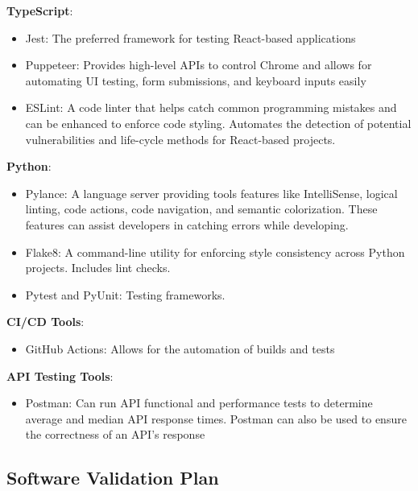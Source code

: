 \documentclass[12pt, titlepage]{article}
\begin{document}
  \textbf{TypeScript}:
   \begin{itemize}
   \item Jest: The preferred framework for testing React-based applications
   \item Puppeteer: Provides high-level APIs to control Chrome and allows for automating UI testing, form submissions, and keyboard inputs easily
   \item ESLint: A code linter that helps catch common programming mistakes and can be enhanced to enforce code styling. Automates the detection of potential vulnerabilities and life-cycle methods for React-based projects.
   \end{itemize}
   \textbf{Python}:
   \begin{itemize}
   \item Pylance: A language server providing tools features like IntelliSense, logical linting, code actions, code navigation, and semantic colorization. These features can assist developers in catching errors while developing.
   \item Flake8: A command-line utility for enforcing style consistency across Python projects. Includes lint checks.
   \item Pytest and PyUnit: Testing frameworks.
   \end{itemize}
  \textbf{CI/CD Tools}:
  \begin{itemize}
  \item GitHub Actions: Allows for the automation of builds and tests
  \end{itemize}
    \textbf{API Testing Tools}:
  \begin{itemize}
  \item Postman: Can run API functional and performance tests to determine average and median API response times. Postman can also be used to ensure the correctness of an API's response 
  \end{itemize}

\subsection{Software Validation Plan}


\end{document}
